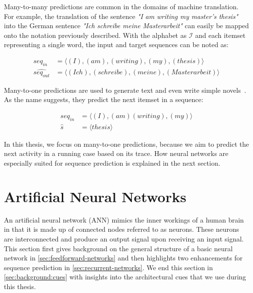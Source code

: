 Many-to-many predictions are common in the domains of machine translation. For example, the translation of the sentence \textit{"I am writing my master's thesis"} into the German sentence \textit{"Ich schreibe meine Masterarbeit"} can easily be mapped onto the notation previously described. With the alphabet as $\mathscr{I}$ and each itemset representing a single word, the input and target sequences can be noted as:

\begin{equation*}
\begin{split}
           seq_{in} &= \langle(I),(am),(writing),(my),(thesis)\rangle\\
\widehat{seq_{out}} &= \langle(Ich),(schreibe),(meine),(Masterarbeit)\rangle
\end{split}
\end{equation*}

Many-to-one predictions are used to generate text and even write simple novels~\cite{web:text-generation-machinelearningmastery, web:text-generation-freecodecamp}. As the name suggests, they predict the next itemset in a sequence:

\begin{equation*}
\begin{split}
seq_{in}  &= \langle(I),(am) (writing),(my)\rangle\\
\hat{s} &= \langle thesis\rangle
\end{split}
\end{equation*}

In this thesis, we focus on many-to-one predictions, because we aim to predict the next activity in a running case based on its trace. How neural networks are especially suited for sequence prediction is explained in the next section.

\section{Artificial Neural Networks}\label{sec:artificial-neural-networks}
An artificial neural network (ANN) mimics the inner workings of a human brain in that it is made up of connected nodes referred to as neurons. These neurons are interconnected and produce an output signal upon receiving an input signal. This section first gives background on the general structure of a basic neural network in \autoref{sec:feedforward-networks} and then highlights two enhancements for sequence prediction in \autoref{sec:recurrent-networks}.
We end this section in \autoref{sec:background:cues} with insights into the architectural cues that we use during this thesis.

